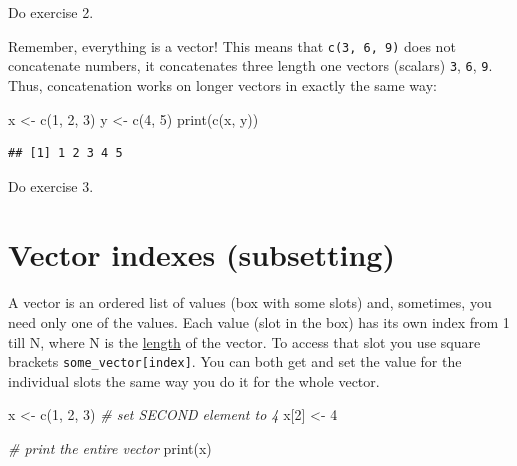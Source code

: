\documentclass[
]{book}
\newenvironment{Shaded}{\begin{snugshade}}{\end{snugshade}}
\newcommand{\CommentTok}[1]{\textcolor[rgb]{0.56,0.35,0.01}{\textit{#1}}}
\newcommand{\DecValTok}[1]{\textcolor[rgb]{0.00,0.00,0.81}{#1}}
\newcommand{\FunctionTok}[1]{\textcolor[rgb]{0.00,0.00,0.00}{#1}}
\newcommand{\NormalTok}[1]{#1}
\newcommand{\OtherTok}[1]{\textcolor[rgb]{0.56,0.35,0.01}{#1}}
\begin{document}
Do exercise 2.

Remember, everything is a vector! This means that \texttt{c(3,\ 6,\ 9)} does not concatenate numbers, it concatenates three length one vectors (scalars) \texttt{3}, \texttt{6}, \texttt{9}. Thus, concatenation works on longer vectors in exactly the same way:

\begin{Shaded}
\begin{Highlighting}[]
\NormalTok{x }\OtherTok{\textless{}{-}} \FunctionTok{c}\NormalTok{(}\DecValTok{1}\NormalTok{, }\DecValTok{2}\NormalTok{, }\DecValTok{3}\NormalTok{)}
\NormalTok{y }\OtherTok{\textless{}{-}} \FunctionTok{c}\NormalTok{(}\DecValTok{4}\NormalTok{, }\DecValTok{5}\NormalTok{)}
\FunctionTok{print}\NormalTok{(}\FunctionTok{c}\NormalTok{(x, y))}
\end{Highlighting}
\end{Shaded}

\begin{verbatim}
## [1] 1 2 3 4 5
\end{verbatim}

Do exercise 3.

\hypertarget{vector-index}{%
\section{Vector indexes (subsetting)}\label{vector-index}}

A vector is an ordered list of values (box with some slots) and, sometimes, you need only one of the values. Each value (slot in the box) has its own index from 1 till N, where N is the \href{https://stat.ethz.ch/R-manual/R-devel/library/base/html/length.html}{length} of the vector. To access that slot you use square brackets \texttt{some\_vector{[}index{]}}. You can both get and set the value for the individual slots the same way you do it for the whole vector.

\begin{Shaded}
\begin{Highlighting}[]
\NormalTok{x }\OtherTok{\textless{}{-}} \FunctionTok{c}\NormalTok{(}\DecValTok{1}\NormalTok{, }\DecValTok{2}\NormalTok{, }\DecValTok{3}\NormalTok{)}
\CommentTok{\# set SECOND element to 4}
\NormalTok{x[}\DecValTok{2}\NormalTok{] }\OtherTok{\textless{}{-}} \DecValTok{4}

\CommentTok{\# print the entire vector}
\FunctionTok{print}\NormalTok{(x)}
\end{Highlighting}
\end{Shaded}
\end{document}
